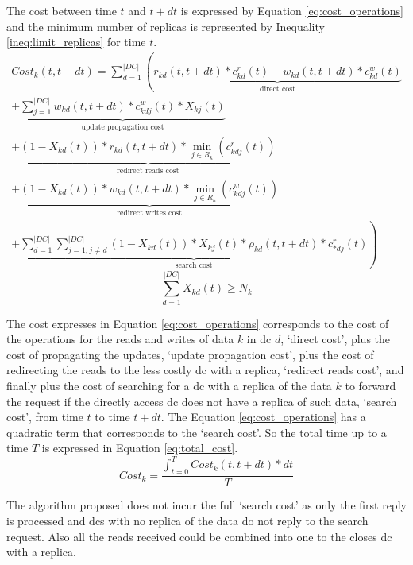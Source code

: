 \documentclass[english]{article}
\begin{document}
The cost between time $t$ and $t+dt$ is expressed by Equation \ref{eq:cost_operations} and the minimum number of replicas is represented by Inequality \ref{ineq:limit_replicas} for time $t$.
\begin{equation} \label{eq:cost_operations}
	\begin{split}
		 Cost_{k}(t, t+dt) = \sum^{|DC|}_{d = 1} \left(\underbrace{r_{kd}(t, t+dt) * c^{r}_{kd}(t) + w_{kd}(t, t+dt) * c^{w}_{kd}(t)}_\text{direct cost} \right. \\
		 \left. + \underbrace{\sum^{|DC|}_{j = 1} w_{kd}(t, t+dt) * c^{w}_{kdj}(t) * X_{kj}(t)}_\text{update propagation cost} \right. \\ 
		 \left. + \underbrace{(1 - X_{kd}(t)) * r_{kd}(t, t+dt) * \min_{j \in R_{k}}(c^{r}_{kdj}(t))}_\text{redirect reads cost} \right. \\  
		 \left. + \underbrace{(1 - X_{kd}(t)) * w_{kd}(t, t+dt) * \min_{j \in R_{k}}(c^{w}_{kdj}(t))}_\text{redirect writes cost}  \right. \\ \left. + \underbrace{\sum^{|DC|}_{d = 1}  \sum^{|DC|}_{j = 1, j \neq d}  (1 - X_{kd}(t)) * X_{kj}(t) * \rho_{kd}(t, t+dt)  * c^{r}_{*dj}(t)}_\text{search cost}\right)
	 \end{split}
\end{equation}
\begin{equation} \label{ineq:limit_replicas}
	\sum^{|DC|}_{d = 1} X_{kd}(t) \ge N_{k}
\end{equation}

The cost expresses in Equation \ref{eq:cost_operations} corresponds to the cost of the operations for the reads and writes of data $k$ in \gls{dc} $d$, `direct cost', plus the cost of propagating the updates, `update propagation cost', plus the cost of redirecting the reads to the less costly \gls{dc} with a replica, `redirect reads cost', and finally plus the cost of searching for a \gls{dc} with a replica of the data $k$ to forward the request if the directly access \gls{dc} does not have a replica of such data, `search cost', from time $t$ to time $t+dt$. The Equation \ref{eq:cost_operations} has a quadratic term that corresponds to the `search cost'. So the total time up to a time $T$ is expressed in Equation \ref{eq:total_cost}.
\begin{equation} \label{eq:total_cost}
	Cost_{k} = \frac{\int^{T}_{t = 0} Cost_{k}(t, t+dt) * dt}{T}
\end{equation}

The algorithm proposed does not incur the full `search cost' as only the first reply is processed and \glspl{dc} with no replica of the data do not reply to the search request. Also all the reads received could be combined into one to the closes \gls{dc} with a replica.
\end{document}
